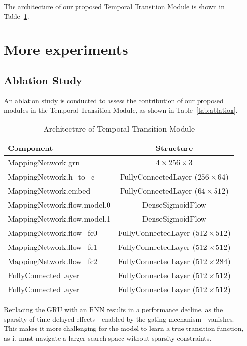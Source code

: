 The architecture of our proposed Temporal Transition Module is shown in Table~\ref{tab:mapping_network}.


\section{More experiments}
\subsection{Ablation Study}
An ablation study is conducted to assess the contribution of our proposed modules in the Temporal Transition Module, as shown in Table~\ref{tab:ablation}.
\begin{table}[htbp]
    \centering
    \caption{Architecture of Temporal Transition Module}
    \label{tab:mapping_network}
    \begin{tabular}{l c}
        \toprule
        \textbf{Component} & \textbf{Structure} \\ 
        \midrule
        MappingNetwork.gru & $4 \times 256 \times 3$  \\ 
        MappingNetwork.h\_to\_c & FullyConnectedLayer ($256 \times 64$) \\ 
        MappingNetwork.embed & FullyConnectedLayer ($64 \times 512$) \\ 
        MappingNetwork.flow.model.0 & DenseSigmoidFlow \\ 
        MappingNetwork.flow.model.1 & DenseSigmoidFlow \\ 
        MappingNetwork.flow\_fc0 & FullyConnectedLayer ($512 \times 512$) \\ 
        MappingNetwork.flow\_fc1 & FullyConnectedLayer ($512 \times 512$) \\ 
        MappingNetwork.flow\_fc2 & FullyConnectedLayer ($512 \times 284$) \\ 
        FullyConnectedLayer & FullyConnectedLayer ($512 \times 512$) \\ 
        FullyConnectedLayer & FullyConnectedLayer ($512 \times 512$) \\ 
        \bottomrule
    \end{tabular}
\end{table}
Replacing the GRU with an RNN results in a performance decline, as the sparsity of time-delayed effects—enabled by the gating mechanism—vanishes. This makes it more challenging for the model to learn a true transition function, as it must navigate a larger search space without sparsity constraints.

